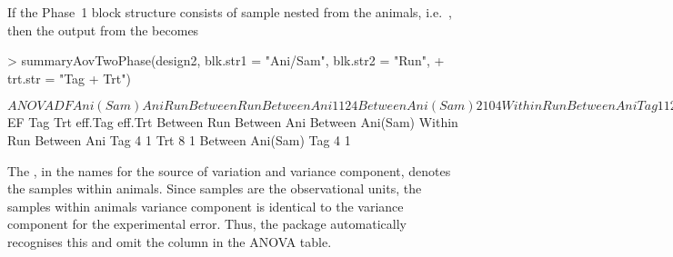 \documentclass[article]{jss}
\begin{document}
If the Phase~1 block structure consists of sample nested from the animals, i.e.\ , then the output from the  becomes
\begin{CodeChunk}
\begin{CodeInput}
> summaryAovTwoPhase(design2, blk.str1 = "Ani/Sam", blk.str2 = "Run", 
+  trt.str = "Tag + Trt")                                    
\end{CodeInput}
\begin{CodeOutput}
$ANOVA
                    DF Ani(Sam) Ani Run
Between Run                            
   Between Ani      1  1        2   4  
   Between Ani(Sam) 2  1        0   4  
Within Run                             
   Between Ani                         
      Tag           1  1        2   0  
      Trt           1  1        2   0  
      Residual      4  1        2   0  
   Between Ani(Sam)                    
      Tag           2  1        0   0  
      Residual      4  1        0   0  

$EF
                    Tag Trt eff.Tag eff.Trt
Between Run                                
   Between Ani                             
   Between Ani(Sam)                        
Within Run                                 
   Between Ani                             
      Tag           4       1              
      Trt               8           1      
   Between Ani(Sam)                        
      Tag           4       1         
\end{CodeOutput}
\end{CodeChunk}
The , in the names for the source of variation and variance component, denotes the samples within animals. Since samples are the observational units, the samples within animals variance component is identical to the variance component for the experimental error. Thus, the package automatically recognises this and omit the column  in the ANOVA table.
\end{document}
